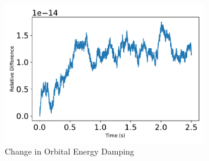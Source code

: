 \begin{figure}[htbp]\centerline{\includegraphics[width=0.8\textwidth]{AutoTeX/ChangeInOrbitalEnergyDamping}}\caption{Change in Orbital Energy Damping}\label{fig:ChangeInOrbitalEnergyDamping}\end{figure}